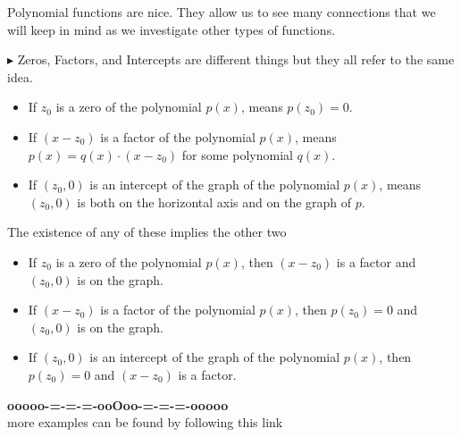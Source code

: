 \documentclass{ximera}
\begin{document}
Polynomial functions are nice.  They allow us to see many connections that we will keep in mind as we investigate other types of functions.


\textbf{\textcolor{red!70!darkgray}{$\blacktriangleright$}} Zeros, Factors, and Intercepts are different things but they all refer to the same idea.





\begin{itemize}

\item If $z_0$ is a zero of the polynomial $p(x)$, means $p(z_0)=0$.


\item If $(x-z_0)$ is a factor of the polynomial $p(x)$, means $p(x) = q(x) \cdot (x-z_0)$ for some polynomial $q(x)$.


\item If $(z_0,0)$ is an intercept of the graph of the polynomial $p(x)$, means $(z_0,0)$ is both on the horizontal axis and on the graph of $p$.

\end{itemize}


The existence of any of these implies the other two






\begin{itemize}

\item If $z_0$ is a zero of the polynomial $p(x)$, then $(x-z_0)$ is a factor and $(z_0,0)$ is on the graph.


\item If $(x-z_0)$ is a factor of the polynomial $p(x)$, then $p(z_0)=0$ and $(z_0,0)$ is on the graph.


\item If $(z_0,0)$ is an intercept of the graph of the polynomial $p(x)$, then $p(z_0)=0$ and $(x-z_0)$ is a factor.

\end{itemize}











\begin{center}
\textbf{\textcolor{green!50!black}{ooooo-=-=-=-ooOoo-=-=-=-ooooo}} \\

more examples can be found by following this link\\ 

\end{center}
\end{document}

